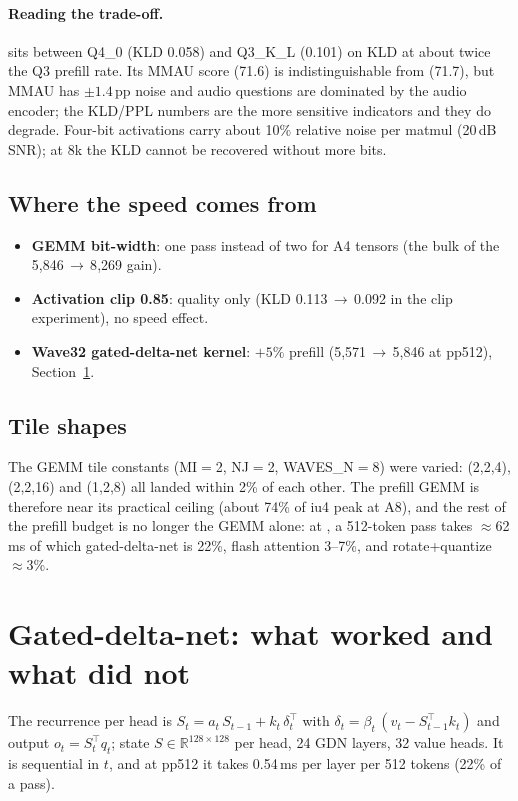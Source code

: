 \documentclass[10pt,a4paper]{article}
\newcommand{\tx}[1]{\texttt{\detokenize{#1}}}
\begin{document}
\paragraph{Reading the trade-off.} \tx{fast} sits between Q4\_0 (KLD 0.058) and Q3\_K\_L (0.101) on KLD at about twice the
Q3 prefill rate. Its MMAU score (71.6) is indistinguishable from \tx{quality} (71.7), but MMAU has $\pm1.4$\,pp noise and
audio questions are dominated by the audio encoder; the KLD/PPL numbers are the more sensitive indicators and they do degrade.
Four-bit activations carry about 10\% relative noise per matmul (20\,dB SNR); at 8k the KLD cannot be recovered without
more bits.

\subsection{Where the speed comes from}
\begin{itemize}
\item \textbf{GEMM bit-width}: one pass instead of two for A4 tensors (the bulk of the 5{,}846\,$\to$\,8{,}269 gain).
\item \textbf{Activation clip 0.85}: quality only (KLD 0.113\,$\to$\,0.092 in the clip experiment), no speed effect.
\item \textbf{Wave32 gated-delta-net kernel}: $+5\%$ prefill (5{,}571\,$\to$\,5{,}846 at pp512), Section~\ref{sec:gdn}.
\end{itemize}

\subsection{Tile shapes}
\label{sec:tile}
The GEMM tile constants (MI$=$2, NJ$=$2, WAVES\_N$=$8) were varied: (2,2,4), (2,2,16) and (1,2,8) all landed within 2\% of
each other. The prefill GEMM is therefore near its practical ceiling (about 74\% of iu4 peak at A8), and the rest of the
prefill budget is no longer the GEMM alone: at \tx{fast}, a 512-token pass takes $\approx$62\,ms of which gated-delta-net is
22\%, flash attention 3--7\%, and rotate+quantize $\approx$3\%.

\section{Gated-delta-net: what worked and what did not}
\label{sec:gdn}

The recurrence per head is $S_t = a_t\,S_{t-1} + k_t\,\delta_t^{\!\top}$ with $\delta_t = \beta_t\,(v_t - S_{t-1}^{\!\top}k_t)$ and
output $o_t=S_t^{\!\top}q_t$; state $S\in\mathbb{R}^{128\times128}$ per head, 24 GDN layers, 32 value heads. It is
sequential in $t$, and at pp512 it takes 0.54\,ms per layer per 512 tokens (22\% of a \tx{fast} pass).
\end{document}
